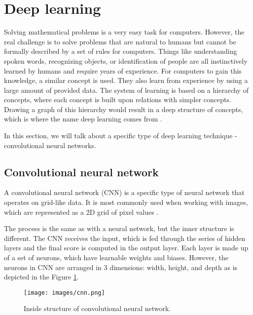 \section{Deep learning}
    

Solving mathematical problems is a very easy task for computers. However, the real challenge is to solve problems that are natural to humans but cannot be formally described by a set of rules for computers. Things like understanding spoken words, recognizing objects, or identification of people are all instinctively learned by humans and require years of experience. For computers to gain this knowledge, a similar concept is used. They also learn from experience by using a large amount of provided data. The system of learning is based on a hierarchy of concepts, where each concept is built upon relations with simpler concepts. Drawing a graph of this hierarchy would result in a deep structure of concepts, which is where the name deep learning comes from \cite{Goodfellow-et-al-2016}.

In this section, we will talk about a specific type of deep learning technique - convolutional neural networks. 

\subsection{Convolutional neural network}

A convolutional neural network (CNN) is a specific type of neural network that operates on grid-like data. It is most commonly used when working with images, which are represented as a 2D grid of pixel values \cite{Goodfellow-et-al-2016}.

The process is the same as with a neural network, but the inner structure is different. The CNN receives the input, which is fed through the series of hidden layers and the final score is computed in the output layer. Each layer is made up of a set of neurons, which have learnable weights and biases. However, the neurons in CNN are arranged in 3 dimensions: width, height, and depth as is depicted in the Figure \ref{img:cnn0}.

\begin{figure}[h]
    \centering
    \texttt{[image: images/cnn.png]}
    \caption{Inside structure of convolutional neural network.}
    \label{img:cnn0}
\end{figure}

